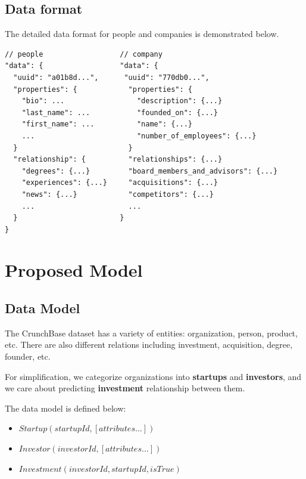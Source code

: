 \subsection{Data format}\label{data-format}

The detailed data format for people and companies is demonstrated below.

\small

\begin{verbatim}
// people                  // company
"data": {                  "data": {           
  "uuid": "a01b8d...",      "uuid": "770db0...",                         
  "properties": {            "properties": {                   
    "bio": ...                 "description": {...}                
    "last_name": ...           "founded_on": {...}                      
    "first_name": ...          "name": {...}                       
    ...                        "number_of_employees": {...}
  }                          }     
  "relationship": {          "relationships": {...}                     
    "degrees": {...}         "board_members_and_advisors": {...}
    "experiences": {...}     "acquisitions": {...}                          
    "news": {...}            "competitors": {...}                   
    ...                      ...         
  }                        }     
}                          
\end{verbatim}

\normalsize

\section{Proposed Model}\label{proposed-model}

\subsection{Data Model}\label{data-model}

The CrunchBase dataset has a variety of entities: organization, person,
product, etc. There are also different relations including investment,
acquisition, degree, founder, etc.

For simplification, we categorize organizations into \textbf{startups}
and \textbf{investors}, and we care about predicting \textbf{investment}
relationship between them.

The data model is defined below:

\begin{itemize}
\itemsep1pt\parskip0pt
\item
  \(Startup(startupId, [attributes...])\)
\item
  \(Investor(investorId, [attributes...])\)
\item
  \(Investment(investorId, startupId, isTrue)\)
\end{itemize}


